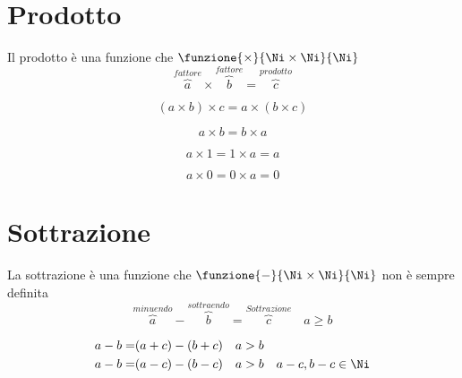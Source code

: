 \section{Prodotto}
\begin{defn}[Prodotto]
Il prodotto è una funzione che $\funzione{\times}{\Ni\times\Ni}{\Ni}$
\begin{equation*}
\overbrace{a}^{fattore}\times\overbrace{b}^{fattore}=\overbrace{c}^{prodotto}
\end{equation*}
\end{defn}
\begin{prop}[Associtiva]
\begin{equation*}
(a\times b)\times c=a\times(b\times c) 
\end{equation*}
\end{prop}
\begin{prop}[Commutativa]
	\begin{equation*}
	a\times b=b\times a
	\end{equation*}
\end{prop}
\begin{prop}
\begin{equation*}
a\times 1=1\times a=a
\end{equation*}
\end{prop}
\begin{prop}
\begin{equation*}
a\times 0=0\times a=0
\end{equation*}
\end{prop}
\section{Sottrazione}
\begin{defn}[Sottrazione]
La sottrazione è una funzione che $\funzione{-}{\Ni\times\Ni}{\Ni}$ non è sempre definita
\begin{equation*}
\overbrace{a}^{minuendo}-\overbrace{b}^{sottraendo}=\overbrace{c}^{Sottrazione}\quad a\geq b
\end{equation*}
\end{defn}
\begin{prop}
	\begin{align*}
	a-b=&(a+c)-(b+c)\quad a>b\\
	a-b=&(a-c)-(b-c)\quad a>b\quad a-c,b-c\in\Ni
	\end{align*}
\end{prop}
